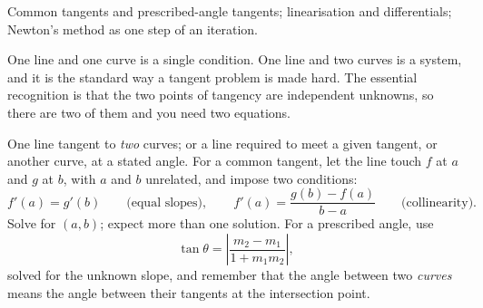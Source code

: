 \begin{seealsob}Common tangents and prescribed-angle tangents; linearisation and differentials; Newton's method as one step of an iteration.\end{seealsob}

One line and one curve is a single condition. One line and two curves is a system, and it is the standard way a tangent problem is made hard. The essential recognition is that the two points of tangency are independent unknowns, so there are two of them and you need two equations.

\cue One line tangent to \emph{two} curves; or a line required to meet a given tangent, or another curve, at a stated angle.
\method For a common tangent, let the line touch $f$ at $a$ and $g$ at $b$, with $a$ and $b$ unrelated, and impose two conditions:
\[
f'(a)=g'(b)\qquad\text{(equal slopes)},\qquad f'(a)=\frac{g(b)-f(a)}{b-a}\qquad\text{(collinearity)} .
\]
Solve for $(a,b)$; expect more than one solution. For a prescribed angle, use
\[
\tan\theta=\left|\frac{m_{2}-m_{1}}{1+m_{1}m_{2}}\right| ,
\]
solved for the unknown slope, and remember that the angle between two \emph{curves} means the angle between their tangents at the intersection point.

